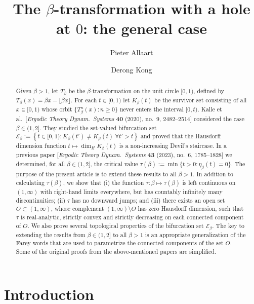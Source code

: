\documentclass[12pt]{amsart}
\title[The $\beta$-transformation with a hole at $0$]{The $\beta$-transformation with a hole at $0$: the general case}
\author[P. Allaart]{Pieter Allaart}
\author[D. Kong]{Derong Kong}
\theoremstyle{definition}
\theoremstyle{remark}
\numberwithin{equation}{section}
\newcommand{\E}{\mathscr{E}}
\newcommand{\set}[1]{\left\{#1\right\}}
\newcommand{\f}{\infty}
\begin{document}

\begin{abstract}
Given $\beta>1$, let $T_\beta$ be the $\beta$-transformation on the unit circle $[0,1)$, defined by $T_\beta(x)=\beta x-\lfloor \beta x\rfloor$. For each $t\in[0,1)$ let $K_\beta(t)$ be the survivor set consisting of all $x\in[0,1)$ whose orbit $\{T^n_\beta(x): n\ge 0\}$ never enters the interval $[0,t)$.  Kalle et al.~[{\em Ergodic Theory Dynam.~Systems} {\bf 40} (2020), no.~9, 2482--2514] considered the case $\beta\in(1,2]$. They studied the set-valued bifurcation set $\E_\beta:=\set{t\in[0,1): K_\beta(t')\ne K_\beta(t)~\forall t'>t}$ and proved that the Hausdorff dimension function $t\mapsto\dim_H K_\beta(t)$ is a non-increasing Devil's staircase. In a previous paper [{\em Ergodic Theory Dynam.~Systems} {\bf 43} (2023), no.~6, 1785--1828] we determined, for all $\beta\in(1,2]$, the critical value $\tau(\beta):=\min\{t>0: \eta_\beta(t)=0\}$. The purpose of the present article is to extend these results to all $\beta>1$. In addition to calculating $\tau(\beta)$, we show that (i) the function $\tau: \beta\mapsto\tau(\beta)$ is left continuous on $(1,\f)$ with right-hand limits everywhere, but has countably infinitely many discontinuities; (ii) $\tau$ has no downward jumps; and (iii) there exists an open set $O\subset(1,\f)$, whose complement $(1,\f)\setminus O$ has zero Hausdorff dimension, such that $\tau$ is real-analytic, strictly convex and strictly decreasing on each connected component of $O$. %
We also prove several topological properties of the bifurcation set $\E_\beta$. The key to extending the results from $\beta\in(1,2]$ to all $\beta>1$ is an appropriate generalization of the Farey words that are used to parametrize the connected components of the set $O$. Some of the original proofs from the above-mentioned papers are simplified. 
\end{abstract}


\maketitle


\section{Introduction}
\end{document}
